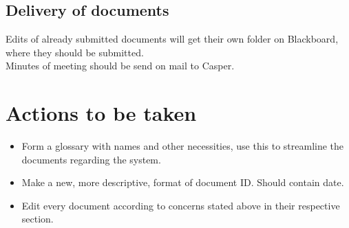 \subsection*{Delivery of documents}
Edits of already submitted documents will get their own folder on Blackboard, where they should be submitted.\\
Minutes of meeting should be send on mail to Casper.

\section*{Actions to be taken}
\begin{itemize}
    \item Form a glossary with names and other necessities, use this to streamline the documents regarding the system.
    \item Make a new, more descriptive, format of document ID. Should contain date.
    \item Edit every document according to concerns stated above in their respective section.
\end{itemize}
